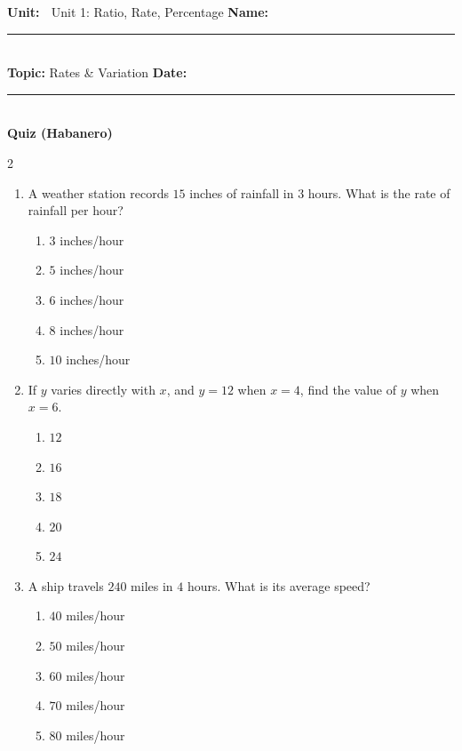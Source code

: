 \documentclass[10pt]{article}
\begin{document}
\enlargethispage{2.5cm}

\begin{tcolorbox}[colback=mainblue!5, colframe=mainblue, sharp corners, boxrule=0.5pt]
    \small \textbf{Unit:} 📘 Unit 1: Ratio, Rate, Percentage \hfill \textbf{Name:} \rule{3cm}{0.4pt} \\
    \small \textbf{Topic:} Rates & Variation \hfill \textbf{Date:} \rule{2cm}{0.4pt} \\
    \centering \textbf{\large Quiz (Habanero)}
\end{tcolorbox}

\vspace{0.2cm}

\begin{multicols}{2}
\begin{enumerate}[label=\textbf{Q\arabic*.}, leftmargin=*, itemsep=6pt, parsep=0pt]

  \item \small A weather station records $15$ inches of rainfall in $3$ hours. What is the rate of rainfall per hour?
  \begin{enumerate}[label=(\Alph*), leftmargin=0.6cm, nosep, itemsep=2pt]
    \item $3$ inches/hour
    \item $5$ inches/hour
    \item $6$ inches/hour
    \item $8$ inches/hour
    \item $10$ inches/hour
  \end{enumerate}

  \item \small If $y$ varies directly with $x$, and $y = 12$ when $x = 4$, find the value of $y$ when $x = 6$.
  \begin{enumerate}[label=(\Alph*), leftmargin=0.6cm, nosep, itemsep=2pt]
    \item $12$
    \item $16$
    \item $18$
    \item $20$
    \item $24$
  \end{enumerate}

  \item \small A ship travels $240$ miles in $4$ hours. What is its average speed?
  \begin{enumerate}[label=(\Alph*), leftmargin=0.6cm, nosep, itemsep=2pt]
    \item $40$ miles/hour
    \item $50$ miles/hour
    \item $60$ miles/hour
    \item $70$ miles/hour
    \item $80$ miles/hour
  \end{enumerate}


\end{enumerate}
\end{multicols}
\end{document}
